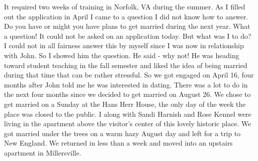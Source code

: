 It required two weeks of training in Norfolk, VA during the summer.
As I filled out the application in April I came to a question I did not know how to answer.
Do you have or might you have plans to get married during the next year.
What a question! It could not be asked on an application today.
But what was I to do? I could not in all fairness answer this by myself since I was now in relationship with John.
So I showed him the question.
He said - why not! He was heading toward student teaching in the fall semester and liked the idea of being married during that time that can be rather stressful.
So we got engaged on April 16, four months after John told me he was interested in dating.
There was a lot to do in the next four months since we decided to get married on August 26.
We chose to get married on a Sunday at the Hans Herr House, the only day of the week the place was closed to the public.
I along with Sandi Harnish and Rose Kennel were living in the apartment above the visitor's center of this lovely historic place.
We got married under the trees on a warm hazy August day and left for a trip to New England.
We returned in less than a week and moved into an upstairs apartment in Millersville.





